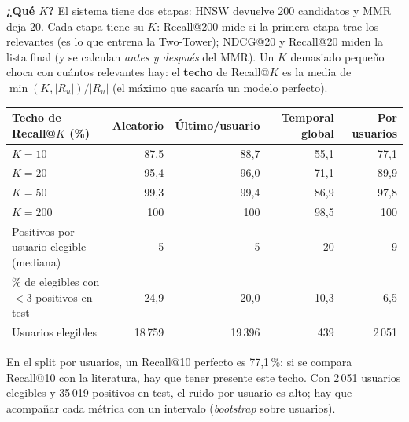 \documentclass[a4paper,11pt]{article}
\begin{document}
\textbf{¿Qué $K$?} El sistema tiene dos etapas: HNSW devuelve 200 candidatos y MMR deja 20. Cada etapa tiene su $K$:
Recall@200 mide si la primera etapa trae los relevantes (es lo que entrena la Two-Tower); NDCG@20 y Recall@20 miden la lista final
(y se calculan \emph{antes y después} del MMR). Un $K$ demasiado pequeño choca con cuántos relevantes hay: el \textbf{techo} de
Recall@$K$ es la media de $\min(K,|R_u|)/|R_u|$ (el máximo que sacaría un modelo perfecto).
\begin{center}
\small
\begin{tabular}{lrrrr}
\toprule
Techo de Recall@$K$ (\%) & Aleatorio & Último/usuario & Temporal global & Por usuarios \\
\midrule
$K=10$ & 87,5 & 88,7 & 55,1 & 77,1 \\
$K=20$ & 95,4 & 96,0 & 71,1 & 89,9 \\
$K=50$ & 99,3 & 99,4 & 86,9 & 97,8 \\
$K=200$ & 100 & 100 & 98,5 & 100 \\
\addlinespace
Positivos por usuario elegible (mediana) & 5 & 5 & 20 & 9 \\
\% de elegibles con $<3$ positivos en test & 24,9 & 20,0 & 10,3 & 6,5 \\
Usuarios elegibles & 18\,759 & 19\,396 & 439 & 2\,051 \\
\bottomrule
\end{tabular}
\end{center}
En el split por usuarios, un Recall@10 perfecto es 77,1\,\%: si se compara Recall@10 con la literatura, hay que tener presente
este techo. Con 2\,051 usuarios elegibles y 35\,019 positivos en test, el ruido por usuario es alto; hay que acompañar
cada métrica con un intervalo (\emph{bootstrap} sobre usuarios).
\end{document}
